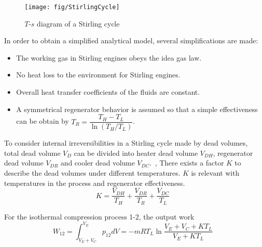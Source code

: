 \noindent \begin{figure}[htbp]
\begin{center}
	\texttt{[image: fig/StirlingCycle]}
	\caption{$T$-$s$ diagram of a Stirling cycle}
	\label{fig:StirlingCycle}
\end{center}
\end{figure}

In order to obtain a simplified analytical model, several simplifications are made:

\begin{itemize}
\item The working gas in Stirling engines obeys the idea gas law.
\item No heat loss to the environment for Stirling engines.
\item Overall heat transfer coefficients of the fluids are constant.
\item A symmetrical regenerator behavior is assumed so that a simple effectiveness can be obtain by $T_{R}=\dfrac{T_{H}-T_{L}}{\ln(T_{H}/T_{L})}$.~\cite{Formosa2010,Juhasz2010}
\end{itemize}

To consider internal irreversibilities in a Stirling cycle made by dead volumes, total dead volume $V_D$ can be divided into heater dead volume $V_{DH}$, regenerator dead volume $V_{DR}$ and cooler dead volume $V_{DC}$.~\cite{Duan2014}, There exists a factor $K$ to describe the dead volumes under different temperatures. $K$ is relevant with temperatures in the process and regenerator effectiveness.
\begin{equation}
	K = \frac{V_{DH}}{T_H} + \frac{V_{DR}}{T_R} + \frac{V_{DC}}{T_L}
\end{equation}

For the isothermal compression process 1-2, the output work
\begin{equation}
	W_{12} = \int^{V_E}_{V_E+V_C}{p_{12}dV}=-mRT_L\ln{\frac{V_E+V_C+KT_L}{V_E+KT_L}}
\end{equation}

